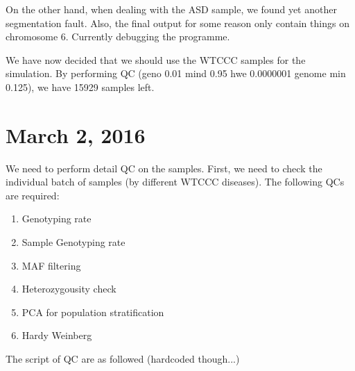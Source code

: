 \documentclass[12pt]{article}
\begin{document}
	On the other hand, when dealing with the ASD sample, we found yet another segmentation fault.
	Also, the final output for some reason only contain things on chromosome 6. 
	Currently debugging the programme.
	
	We have now decided that we should use the WTCCC samples for the simulation.
	By performing QC (\-\-geno 0.01 \-\-mind 0.95 \-\-hwe 0.0000001 \-\-genome \-\-min 0.125), we have 15929 samples left.

	\section{March 2, 2016}
	We need to perform detail QC on the samples. 
	First, we need to check the individual batch of samples (by different WTCCC diseases).
	The following QCs are required:
	\begin{enumerate}
		\item Genotyping rate
		\item Sample Genotyping rate
		\item MAF filtering
		\item Heterozygousity check
		\item PCA for population stratification
		\item Hardy Weinberg
	\end{enumerate}
	
	The script of QC are as followed (hardcoded though...)
	
	\lstset{tabsize=4,breaklines=true}
	
\end{document}
